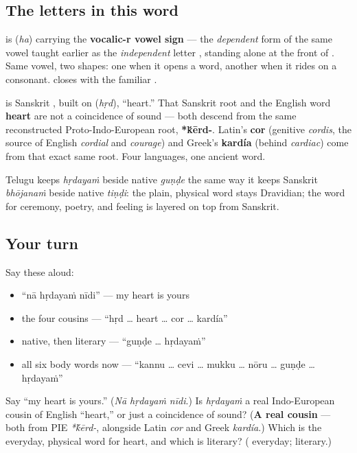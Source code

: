 \subsection*{The letters in this word}
\textbf{} is \textbf{} (\emph{ha}) carrying the \textbf{vocalic-r vowel sign} \textbf{} — the \emph{dependent} form of the same vowel taught earlier as the \emph{independent} letter \textbf{}, standing alone at the front of \textbf{}. Same vowel, two shapes: one when it opens a word, another when it rides on a consonant. \textbf{} closes with the familiar \textbf{ }.

\begin{cousinweb}
\textbf{} is Sanskrit \textbf{}, built on \textbf{} (\emph{hṛd}), \textquotedblleft{}heart.\textquotedblright{} That Sanskrit root and the English word \textbf{heart} are not a coincidence of sound — both descend from the same reconstructed Proto-Indo-European root, \textbf{*\'{k}ērd-}. Latin's \textbf{cor} (genitive \emph{cordis}, the source of English \emph{cordial} and \emph{courage}) and Greek's \textbf{kardía} (behind \emph{cardiac}) come from that exact same root. Four languages, one ancient word.

Telugu keeps \emph{hṛdayaṁ} beside native \emph{guṇḍe} the same way it keeps Sanskrit \emph{bhōjanaṁ} beside native \emph{tiṇḍi}: the plain, physical word stays Dravidian; the word for ceremony, poetry, and feeling is layered on top from Sanskrit.
\end{cousinweb}

\subsection*{Your turn}
Say these aloud:

\begin{itemize}
\raggedright
  \item \textquotedblleft{}nā hṛdayaṁ nīdi\textquotedblright{} — my heart is yours
  \item the four cousins — \textquotedblleft{}hṛd … heart … cor … kardía\textquotedblright{}
  \item native, then literary — \textquotedblleft{}guṇḍe … hṛdayaṁ\textquotedblright{}
  \item all six body words now — \textquotedblleft{}kannu … cevi … mukku … nōru … guṇḍe … hṛdayaṁ\textquotedblright{}
\end{itemize}

\begin{tcolorbox}[breakable,colback=teal!4,colframe=teal!35!black,title={Before you move on}]
Say \textquotedblleft{}my heart is yours.\textquotedblright{} (\emph{Nā hṛdayaṁ nīdi}.) Is \emph{hṛdayaṁ} a real Indo-European cousin of English \textquotedblleft{}heart,\textquotedblright{} or just a coincidence of sound? (\textbf{A real cousin} — both from PIE \emph{*\'{k}ērd-}, alongside Latin \emph{cor} and Greek \emph{kardía}.) Which is the everyday, physical word for heart, and which is literary? (\textbf{} everyday; \textbf{} literary.)
\end{tcolorbox}
